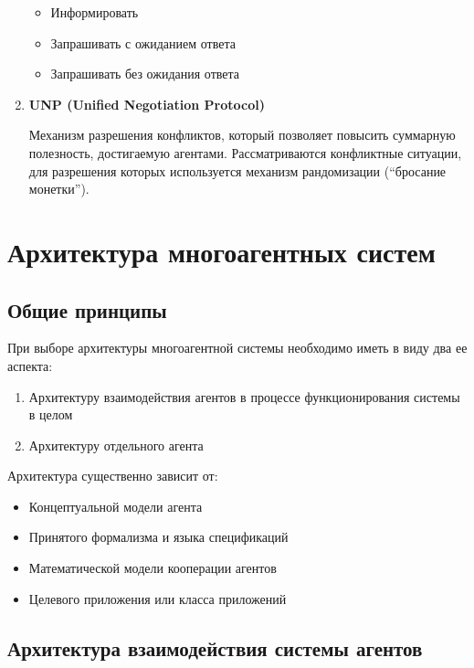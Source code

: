 \begin{enumerate}
  \begin{itemize}
    \item Информировать
    \item Запрашивать с ожиданием ответа
    \item Запрашивать без ожидания ответа
  \end{itemize}
  
  \item \textbf{UNP (Unified Negotiation Protocol)}
  
  Механизм разрешения конфликтов, который позволяет повысить суммарную полезность, достигаемую агентами. Рассматриваются конфликтные ситуации, для разрешения которых используется механизм рандомизации (``бросание монетки'').
\end{enumerate}

\section{Архитектура многоагентных систем}

\subsection{Общие принципы}

При выборе архитектуры многоагентной системы необходимо иметь в виду два ее аспекта:

\begin{enumerate}
  \item Архитектуру взаимодействия агентов в процессе функционирования системы в целом
  \item Архитектуру отдельного агента
\end{enumerate}

Архитектура существенно зависит от:

\begin{itemize}
  \item Концептуальной модели агента
  \item Принятого формализма и языка спецификаций
  \item Математической модели кооперации агентов
  \item Целевого приложения или класса приложений
\end{itemize}

\subsection{Архитектура взаимодействия системы агентов}

